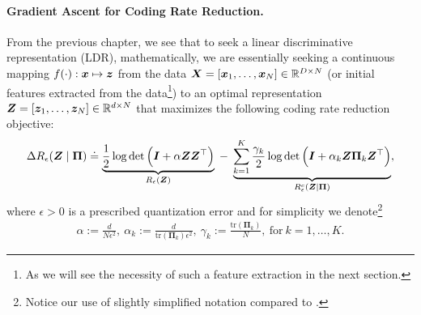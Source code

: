 \documentclass[../../book-main.tex]{subfiles}
\begin{document}
\paragraph{Gradient Ascent for Coding Rate Reduction.} From the previous chapter, we see that to seek a linear discriminative representation (LDR), mathematically, we are essentially seeking a continuous mapping $f(\cdot): \bm{x} \mapsto \bm{z}$ from the data $\bm{X} = [\bm{x}_1, \ldots, \bm{x}_N] \in \mathbb{R}^{D \times N}$ (or initial features extracted from the data\footnote{As we will see the necessity of such a feature extraction in the next section.}) to an optimal representation $\bm{Z} = [\bm{z}_1, \ldots, \bm{z}_N] \in \mathbb{R}^{d \times N}$ that maximizes the following coding rate reduction objective:
\begin{equation}\label{eq:mcr-formulation}
\begin{split}
\Delta R_{\epsilon}(\bm{Z} \mid \bm{\Pi}) \doteq \underbrace{\frac{1}{2}\log\det \Big(\bm{I} + {\alpha} \bm{Z} \bm{Z}^{\top} \Big)}_{R_{\epsilon}(\bm{Z})} \;-\; \underbrace{\sum_{k=1}^{K}\frac{\gamma_{k}}{2} \log\det\Big(\bm{I} + {\alpha_{k}} \bm{Z} \bm{\Pi}_{k} \bm{Z}^{\top} \Big)}_{R_{\epsilon}^c(\bm{Z} \mid \bm \Pi)},
\end{split}
\end{equation}
where $\epsilon > 0$ is a prescribed quantization error and for simplicity we denote\footnote{Notice our use of slightly simplified notation compared to .}
\begin{align*}
    \alpha := \frac{d}{N\epsilon^2},\ \alpha_{k} := \frac{d}{\mathrm{tr}(\bm{\Pi}_{k})\epsilon^2},\ \gamma_{k} := \frac{\mathrm{tr}(\bm{\Pi}_{k})}{N},\ \text{for}\ k = 1,\ldots, K.
\end{align*}
\end{document}
